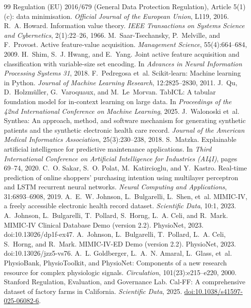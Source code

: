 \documentclass[11pt]{article}
\begin{document}
\small

\begin{thebibliography}{99}
 Regulation (EU) 2016/679 (General Data Protection Regulation), Article 5(1)(c): data minimisation. \emph{Official Journal of the European Union}, L119, 2016.
 R.~A. Howard. Information value theory. \emph{IEEE Transactions on Systems Science and Cybernetics}, 2(1):22--26, 1966.
 M.~Saar-Tsechansky, P.~Melville, and F.~Provost. Active feature-value acquisition. \emph{Management Science}, 55(4):664--684, 2009.
 H.~Shim, S.~J. Hwang, and E.~Yang. Joint active feature acquisition and classification with variable-size set encoding. In \emph{Advances in Neural Information Processing Systems 31}, 2018.
 F.~Pedregosa et~al. Scikit-learn: Machine learning in Python. \emph{Journal of Machine Learning Research}, 12:2825--2830, 2011.
 J.~Qu, D.~Holzm\"{u}ller, G.~Varoquaux, and M.~Le~Morvan. TabICL: A tabular foundation model for in-context learning on large data. In \emph{Proceedings of the 42nd International Conference on Machine Learning}, 2025.
 J.~Walonoski et~al. Synthea: An approach, method, and software mechanism for generating synthetic patients and the synthetic electronic health care record. \emph{Journal of the American Medical Informatics Association}, 25(3):230--238, 2018.
 S.~Matzka. Explainable artificial intelligence for predictive maintenance applications. In \emph{Third International Conference on Artificial Intelligence for Industries (AI4I)}, pages 69--74, 2020.
 C.~O. Sakar, S.~O. Polat, M.~Katircioglu, and Y.~Kastro. Real-time prediction of online shoppers' purchasing intention using multilayer perceptron and LSTM recurrent neural networks. \emph{Neural Computing and Applications}, 31:6893--6908, 2019.
 A.~E.~W. Johnson, L.~Bulgarelli, L.~Shen, et~al. MIMIC-IV, a freely accessible electronic health record dataset. \emph{Scientific Data}, 10:1, 2023.
 A.~Johnson, L.~Bulgarelli, T.~Pollard, S.~Horng, L.~A. Celi, and R.~Mark. MIMIC-IV Clinical Database Demo (version 2.2). PhysioNet, 2023. doi:10.13026/dp1f-ex47.
 A.~Johnson, L.~Bulgarelli, T.~Pollard, L.~A. Celi, S.~Horng, and R.~Mark. MIMIC-IV-ED Demo (version 2.2). PhysioNet, 2023. doi:10.13026/jzz5-vs76.
 A.~L. Goldberger, L.~A.~N. Amaral, L.~Glass, et~al. PhysioBank, PhysioToolkit, and PhysioNet: Components of a new research resource for complex physiologic signals. \emph{Circulation}, 101(23):e215--e220, 2000.
 Stanford Regulation, Evaluation, and Governance Lab. Cal-FF: A comprehensive dataset of factory farms in California. \emph{Scientific Data}, 2025. \href{https://doi.org/10.1038/s41597-025-06082-6}{doi:10.1038/s41597-025-06082-6}.
\end{thebibliography}
\end{document}
